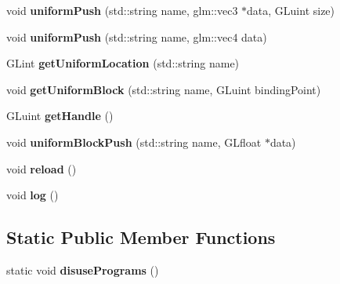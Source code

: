 \begin{DoxyCompactItemize}
\item 
\hypertarget{classfillwave_1_1core_1_1Program_ad785b86a8a2206d013a9aabc1254c92e}{}void {\bfseries uniform\+Push} (std\+::string name, glm\+::vec3 $\ast$data, G\+Luint size)\label{classfillwave_1_1core_1_1Program_ad785b86a8a2206d013a9aabc1254c92e}

\item 
\hypertarget{classfillwave_1_1core_1_1Program_a6cb7e03c5611360fa707a73cad7ede60}{}void {\bfseries uniform\+Push} (std\+::string name, glm\+::vec4 data)\label{classfillwave_1_1core_1_1Program_a6cb7e03c5611360fa707a73cad7ede60}

\item 
\hypertarget{classfillwave_1_1core_1_1Program_aab14c8ac6f92f6355bf2f9bca4a86ce6}{}G\+Lint {\bfseries get\+Uniform\+Location} (std\+::string name)\label{classfillwave_1_1core_1_1Program_aab14c8ac6f92f6355bf2f9bca4a86ce6}

\item 
\hypertarget{classfillwave_1_1core_1_1Program_a29759df895f3acb8e4b5d3f130fa86ed}{}void {\bfseries get\+Uniform\+Block} (std\+::string name, G\+Luint binding\+Point)\label{classfillwave_1_1core_1_1Program_a29759df895f3acb8e4b5d3f130fa86ed}

\item 
\hypertarget{classfillwave_1_1core_1_1Program_a061b46a9a9bb7cf2a405cd098e835dec}{}G\+Luint {\bfseries get\+Handle} ()\label{classfillwave_1_1core_1_1Program_a061b46a9a9bb7cf2a405cd098e835dec}

\item 
\hypertarget{classfillwave_1_1core_1_1Program_a3c13702efd5a50eb1ad56e1d8367dea9}{}void {\bfseries uniform\+Block\+Push} (std\+::string name, G\+Lfloat $\ast$data)\label{classfillwave_1_1core_1_1Program_a3c13702efd5a50eb1ad56e1d8367dea9}

\item 
\hypertarget{classfillwave_1_1core_1_1Program_ad0caa02f8c63cd67fa8d8c8fc9b5092b}{}void {\bfseries reload} ()\label{classfillwave_1_1core_1_1Program_ad0caa02f8c63cd67fa8d8c8fc9b5092b}

\item 
\hypertarget{classfillwave_1_1core_1_1Program_af3582e493be1b1d4a7a121ceea74fff4}{}void {\bfseries log} ()\label{classfillwave_1_1core_1_1Program_af3582e493be1b1d4a7a121ceea74fff4}

\end{DoxyCompactItemize}
\subsection*{Static Public Member Functions}
\begin{DoxyCompactItemize}
\item 
\hypertarget{classfillwave_1_1core_1_1Program_a1caefe231bb4efd53480db32cda114ad}{}static void {\bfseries disuse\+Programs} ()\label{classfillwave_1_1core_1_1Program_a1caefe231bb4efd53480db32cda114ad}

\end{DoxyCompactItemize}


